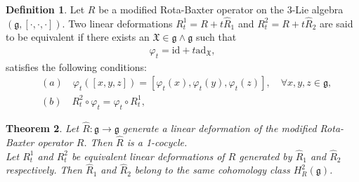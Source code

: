 \documentclass[12pt]{amsart}
\newtheorem{theorem}{Theorem}[section]
\theoremstyle{definition}
\newtheorem{defn}[theorem]{Definition}
\begin{document}
\begin{defn}
Let $R$ be a modified Rota-Baxter operator on the $3$-Lie algebra $(\mathfrak{g}, [\cdot, \cdot, \cdot])$. Two linear deformations $R^1_t = R+t\hat{R}_1$ and $R^2_t = R+t\hat{R}_2$ are said to be equivalent if there exists an $\mathfrak{X}\in \mathfrak{g}\wedge \mathfrak{g}$ such that
 \begin{align*}
   \varphi_t=\mathrm{id} + t\mathrm{ad}_{\mathfrak{X}},
\end{align*}
 satisfies the following conditions:
 \begin{align*}
&(a) \quad \varphi_t([x, y, z])=[ \varphi_t(x), \varphi_t(y),  \varphi_t(z)], \quad \forall x, y, z\in \mathfrak{g},\\
&(b) \quad R_t^2\circ  \varphi_t = \varphi_t \circ R^1_t,
\end{align*}
\end{defn}
\begin{theorem}
 Let $\hat{R}:\mathfrak{g}\rightarrow \mathfrak{g}$ generate a linear deformation of the modified Rota-Baxter operator $R$. Then $\hat{R}$ is a 1-cocycle.\\
 Let $R^1_t$ and $R^2_t$ be equivalent linear deformations of $R$ generated by $\hat{R}_1$ and $\hat{R}_2$ respectively. Then $\hat{R}_1$ and $\hat{R}_2$ belong to the same cohomology class $H^2_R (\mathfrak{g})$.
\end{theorem}
\end{document}
